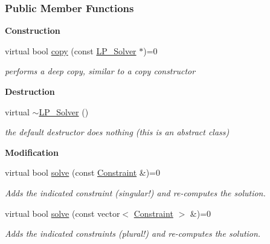 \subsubsection*{Public Member Functions}
\begin{Indent}\textbf{ Construction}\par
\begin{DoxyCompactItemize}
\item 
virtual bool \hyperlink{group___c_l_s_solvers_a36c14a88e9d3ae9d9321acc7877236d0}{copy} (const \hyperlink{group___c_l_s_solvers_class_l_p___solvers_1_1_l_p___solver}{L\+P\+\_\+\+Solver} $\ast$)=0
\begin{DoxyCompactList}\small\item\em performs a deep copy, similar to a copy constructor \end{DoxyCompactList}\end{DoxyCompactItemize}
\end{Indent}
\begin{Indent}\textbf{ Destruction}\par
\begin{DoxyCompactItemize}
\item 
\mbox{\label{group___c_l_s_solvers_a1d530b23b2516c36cbc02173e667d0cf}} 
virtual \hyperlink{group___c_l_s_solvers_a1d530b23b2516c36cbc02173e667d0cf}{$\sim$\+L\+P\+\_\+\+Solver} ()
\begin{DoxyCompactList}\small\item\em the default destructor does nothing (this is an abstract class) \end{DoxyCompactList}\end{DoxyCompactItemize}
\end{Indent}
\begin{Indent}\textbf{ Modification}\par
\begin{DoxyCompactItemize}
\item 
virtual bool \hyperlink{group___c_l_s_solvers_a8b9979fb228ac9ccfe037ad6ca48b314}{solve} (const \hyperlink{group___c_l_s_solvers_class_l_p___solvers_1_1_constraint}{Constraint} \&)=0
\begin{DoxyCompactList}\small\item\em Adds the indicated constraint (singular!) and re-\/computes the solution. \end{DoxyCompactList}\item 
virtual bool \hyperlink{group___c_l_s_solvers_aea1a5bf98a2c4c06b0550cacdf8b88fd}{solve} (const vector$<$ \hyperlink{group___c_l_s_solvers_class_l_p___solvers_1_1_constraint}{Constraint} $>$ \&)=0
\begin{DoxyCompactList}\small\item\em Adds the indicated constraints (plural!) and re-\/computes the solution. \end{DoxyCompactList}\end{DoxyCompactItemize}
\end{Indent}
